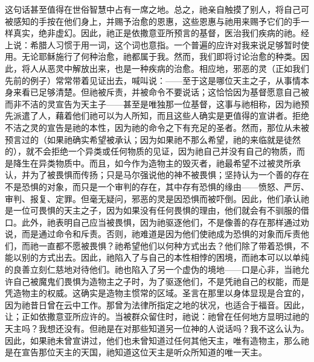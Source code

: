 这句话甚至值得在世俗智慧中占有一席之地。总之，祂亲自触摸了别人，将自己可被感知的手按在他们身上，并赐予治愈的恩惠，这些恩惠与祂用来赐予它们的手一样真实，绝非虚幻。因此，祂正是依撒意亚所预言的基督，医治我们疾病的祂。经上说：希腊人习惯于用一词，这个词也意指。一个普遍的应许对我来说足够暂时使用。无论耶稣施行了何种治愈，祂都属于我。然而，我们即将讨论治愈的种类。因此，将人从恶灵中解放出来，也是一种疾病的治愈。相应地，邪恶的灵（正如我们先前的例子）常常带着见证出去，喊叫说：——至于这是哪位天主之子，从事情本身来看已足够清楚。但祂被斥责，并被命令不要说话；这恰恰因为基督愿意自己被而非不洁的灵宣告为天主子——甚至是唯独那一位基督，这事与祂相称，因为祂预先派遣了人，藉着他们祂可以为人所知，而且这些人确实是更值得的宣讲者。拒绝不洁之灵的宣告是祂的本性，因为祂的命令之下有充足的圣者。然而，那位从未被预言过的（如果祂确实希望被承认；因为如果祂不那么希望，祂的来临就是徒然的），就不会拒绝一个异类或任何物质的见证，因为祂自己并没有自己的物质，而是降生在异类物质中。而且，如今作为造物主的毁灭者，祂最希望不过被灵所承认，并为了被畏惧而传扬；只是马尔强说他的神不被畏惧；坚持认为一个善的存在不是恐惧的对象，而只是一个审判的存在，其中存有恐惧的缘由——愤怒、严厉、审判、报复、定罪。但毫无疑问，邪恶的灵是因恐惧而被吓倒。因此，他们承认祂是一位可畏惧的天主之子，因为如果没有任何畏惧的理由，他们就会有不驯服的借口。此外，祂表明自己应当被畏惧，因为祂驱逐他们，不是像善的存在那样通过劝说，而是通过命令和斥责。否则，祂难道是因为他们使祂成为恐惧的对象而斥责他们，而祂一直都不愿被畏惧？祂希望他们以何种方式出去？他们除了带着恐惧，不能以别的方式出去。因此，祂陷入了与自己的本性相悖的困境，而祂本可以以单纯的良善立刻仁慈地对待他们。祂也陷入了另一个虚伪的境地——口是心非，当祂允许自己被魔鬼们畏惧为造物主之子时，为了驱逐他们，不是凭祂自己的权能，而是凭造物主的权威。\newline{}这确实是造物主惯常的区域。圣言在那里以身体显现是合宜的，因为祂昔日曾在云中工作。那曾为法律所指定之地的状况，也适合于福音。因此，让；正如依撒意亚所应许的。当被群众留住时，祂说：祂曾在任何地方显明过祂的天主吗？我想还没有。但祂是在对那些知道另一位神的人说话吗？我不这么认为。因此，如果祂未曾宣讲过，他们也未曾知道过任何其他天主，唯有造物主，那么祂是在宣告那位天主的天国，祂知道这位天主是听众所知道的唯一天主。\par


